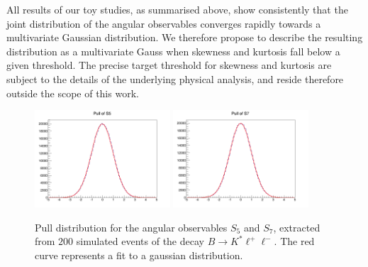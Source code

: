 \documentclass[aps,prd,reprint,nofootinbib,preprintnumbers]{revtex4}
\begin{document}
All results of our toy studies, as summarised above, show consistently that the joint distribution of the angular
observables converges rapidly towards a multivariate Gaussian distribution. We therefore propose to describe the
resulting distribution as a multivariate Gauss when skewness and kurtosis fall below a given threshold.
The precise target threshold for skewness and kurtosis are subject to the details of the underlying physical analysis, and reside therefore outside the scope of this work.

\begin{figure}[t]
        \centering
            \includegraphics[width=0.45\textwidth]{figs/pull-Q2_5_6_S5_200.png}
            \includegraphics[width=0.45\textwidth]{figs/pull-Q2_5_6_S7_200.png}
        \caption{Pull distribution for the angular observables $S_5$ and $S_7$, extracted from $200$ simulated events of the decay $B\to K^*\ell^+\ell^-$. The red curve represents a fit to a gaussian distribution.}
        \label{fig:pulls}
\end{figure}
\end{document}
